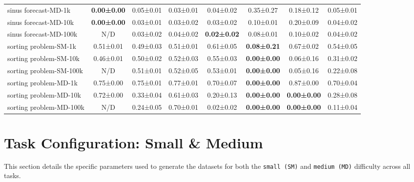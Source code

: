 \documentclass{article}
\begin{document}
\begin{table}[H]
{\begin{tabular}{lccccccc}
sinus forecast-MD-1k                & \textbf{0.00±0.00}  & 0.05±0.01      & 0.03±0.01      & 0.04±0.02      & 0.35±0.27            & 0.18±0.12           & 0.05±0.01      \\
sinus forecast-MD-10k               & \textbf{0.00±0.00}  & 0.03±0.01      & 0.03±0.02      & 0.03±0.02      & 0.10±0.01            & 0.20±0.09           & 0.04±0.02      \\
sinus forecast-MD-100k              & N/D              & 0.03±0.02      & 0.04±0.02      & \textbf{0.02±0.02}  & 0.08±0.01            & 0.10±0.02           & 0.04±0.02      \\
sorting problem-SM-1k                  & 0.51±0.01      & 0.49±0.03      & 0.51±0.01      & 0.61±0.05      & \textbf{0.08±0.21}        & 0.67±0.02           & 0.54±0.05      \\
sorting problem-SM-10k                 & 0.46±0.01      & 0.50±0.02      & 0.52±0.03      & 0.55±0.03      & \textbf{0.00±0.00}        & 0.06±0.16           & 0.31±0.02      \\
sorting problem-SM-100k                & N/D              & 0.51±0.01      & 0.52±0.05      & 0.53±0.01      & \textbf{0.00±0.00}        & 0.05±0.16           & 0.22±0.08      \\
sorting problem-MD-1k                  & 0.75±0.00      & 0.75±0.01      & 0.77±0.01      & 0.70±0.07      & \textbf{0.00±0.00}        & 0.87±0.00           & 0.70±0.04      \\
sorting problem-MD-10k                 & 0.72±0.00      & 0.33±0.04      & 0.61±0.03      & 0.20±0.13      & \textbf{0.00±0.00}        & \textbf{0.00±0.00}       & 0.28±0.08      \\
sorting problem-MD-100k                & N/D              & 0.24±0.05      & 0.70±0.01      & 0.02±0.02      & \textbf{0.00±0.00}        & \textbf{0.00±0.00}       & 0.11±0.04      \\
\bottomrule
\end{tabular}
}
\end{table}

\newpage
\newpage

\section{Task Configuration: Small \& Medium}
\label{app:task_config}

This section details the specific parameters used to generate the datasets for both the \texttt{small (SM)} and \texttt{medium (MD)} difficulty across all tasks. 
\end{document}
